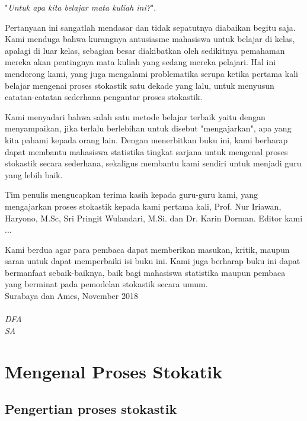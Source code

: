 \documentclass[11pt,b5paper,twoside]{book}
\begin{document}
\noindent "\textit{Untuk apa kita belajar mata kuliah ini?}".\par 
Pertanyaan ini sangatlah mendasar dan tidak sepatutnya diabaikan begitu saja. Kami menduga bahwa kurangnya antusiasme mahasiswa untuk belajar di kelas, apalagi di luar kelas, sebagian besar diakibatkan oleh sedikitnya pemahaman mereka akan pentingnya mata kuliah yang sedang mereka pelajari. Hal ini mendorong kami, yang juga mengalami problematika serupa ketika pertama kali belajar mengenai proses stokastik satu dekade yang lalu, untuk menyusun catatan-catatan sederhana pengantar proses stokastik. \par
Kami menyadari bahwa salah satu metode belajar terbaik yaitu dengan menyampaikan, jika terlalu berlebihan untuk disebut "mengajarkan", apa yang kita pahami kepada orang lain. Dengan menerbitkan buku ini, kami berharap dapat membantu mahasiswa statistika tingkat sarjana untuk mengenal proses stokastik secara sederhana, sekaligus membantu kami sendiri untuk menjadi guru yang lebih baik.\par
Tim penulis mengucapkan terima kasih kepada guru-guru kami, yang mengajarkan proses stokastik kepada kami pertama kali, Prof. Nur Iriawan, Haryono, M.Sc, Sri Pringit Wulandari, M.Si. dan Dr. Karin Dorman. Editor kami ...
\par
Kami berdua agar para pembaca dapat memberikan masukan, kritik, maupun saran untuk dapat memperbaiki isi buku ini. Kami juga berharap buku ini dapat bermanfaat sebaik-baiknya, baik bagi mahasiswa statistika maupun pembaca yang berminat pada pemodelan stokastik secara umum.
\\


\noindent Surabaya dan Ames, November 2018\\
\vspace{.05cm}\\
\noindent \textit{DFA} \\
\textit{SA}

\tableofcontents

\mainmatter

\chapter{Mengenal Proses Stokatik}
	\section{Pengertian proses stokastik} %
	
\end{document}
